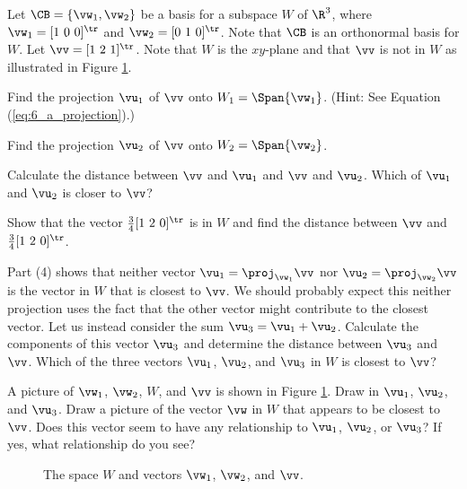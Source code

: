 \begin{pa} \label{pa:6_e_1} Let $\CB = \{\vw_1, \vw_2\}$ be a basis for a subspace $W$ of $\R^3$,  where $\vw_1 = [1 \ 0 \ 0]^{\tr}$ and $\vw_2 = [0 \ 1 \ 0]^{\tr}$. Note that $\CB$ is an orthonormal basis for $W$. Let $\vv = [1 \ 2 \ 1]^{\tr}$. Note that $W$ is the $xy$-plane and that $\vv$ is not in $W$ as illustrated in Figure \ref{F:6_d_o_proj}.
	\be
	\item Find the projection $\vu_1$ of $\vv$ onto $W_1 = \Span\{\vw_1\}$. (Hint: See Equation (\ref{eq:6_a_projection}).) 
		
	\item Find the projection $\vu_2$ of $\vv$ onto $W_2 = \Span\{\vw_2\}$.

	\item Calculate the distance between $\vv$ and $\vu_1$ and $\vv$ and $\vu_2$. Which of $\vu_1$ and $\vu_2$ is closer to $\vv$?
			
	\item Show that the vector $\frac{3}{4} [1 \ 2 \ 0]^{\tr}$ is in $W$ and find the distance between $\vv$ and $\frac{3}{4} [1 \ 2 \ 0]^{\tr}$.


\item Part (4) shows that neither vector $\vu_1 = \proj_{\vw_1} \vv$ nor $\vu_2 = \proj_{\vw_2} \vv$ is the vector in $W$ that is closest to $\vv$. We should probably expect this neither projection uses the fact that the other vector might contribute to the closest vector. Let us instead consider the sum $\vu_3 = \vu_1+\vu_2$. Calculate the components of this vector $\vu_3$ and determine the distance between $\vu_3$ and $\vv$. Which of the three vectors $\vu_1$, $\vu_2$, and $\vu_3$ in $W$ is closest to $\vv$?  

	
\item A picture of $\vw_1$, $\vw_2$, $W$, and $\vv$ is shown in Figure \ref{F:6_d_o_proj}. Draw in $\vu_1$, $\vu_2$, and $\vu_3$. Draw a picture of the vector $\vw$ in $W$ that appears to be closest to $\vv$. Does this vector seem to have any relationship to $\vu_1$, $\vu_2$, or $\vu_3$? If yes, what relationship do you see?
\begin{figure}[h]
\begin{center}
\end{center}
\caption{The space $W$ and vectors $\vw_1$, $\vw_2$, and $\vv$.}
\label{F:6_d_o_proj}
\end{figure}


	\ee
\end{pa}


